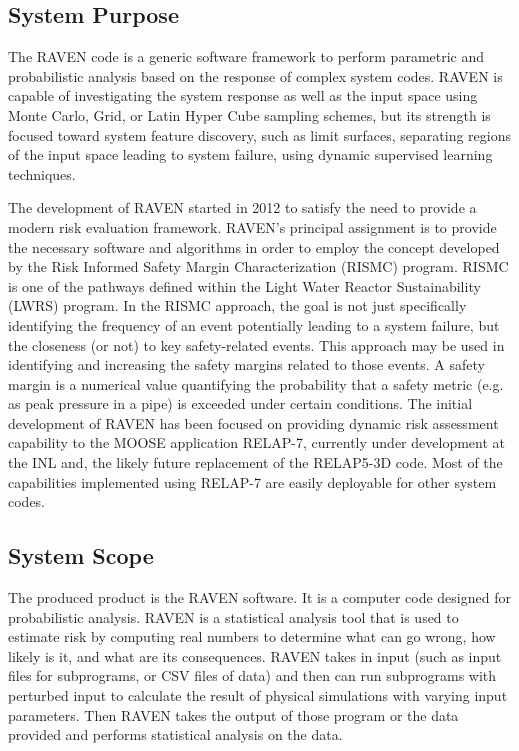 
\subsection{System Purpose}

The RAVEN code is a generic software framework to perform parametric
and probabilistic analysis based on the response of complex system
codes. RAVEN is capable of investigating the system response as well
as the input space using Monte Carlo, Grid, or Latin Hyper Cube
sampling schemes, but its strength is focused toward system feature
discovery, such as limit surfaces, separating regions of the input
space leading to system failure, using dynamic supervised learning
techniques.

The development of RAVEN started in 2012 to satisfy the need to
provide a modern risk evaluation framework. RAVEN's principal
assignment is to provide the necessary software and algorithms in
order to employ the concept developed by the Risk Informed Safety
Margin Characterization (RISMC) program. RISMC is one of the pathways
defined within the Light Water Reactor Sustainability (LWRS)
program. In the RISMC approach, the goal is not just specifically
identifying the frequency of an event potentially leading to a system
failure, but the closeness (or not) to key safety-related events. This
approach may be used in identifying and increasing the safety margins
related to those events. A safety margin is a numerical value
quantifying the probability that a safety metric (e.g. as peak
pressure in a pipe) is exceeded under certain conditions. The initial
development of RAVEN has been focused on providing dynamic risk
assessment capability to the MOOSE application RELAP-7, currently
under development at the INL and, the likely future replacement of the
RELAP5-3D code. Most of the capabilities implemented using RELAP-7 are
easily deployable for other system codes.

\subsection{System Scope}

The produced product is the RAVEN software.  It is a computer
code designed for probabilistic analysis.  RAVEN is a statistical
analysis tool that is used to estimate risk by computing real numbers
to determine what can go wrong, how likely is it, and what are its
consequences.  RAVEN takes in input (such as input files for
subprograms, or CSV files of data) and then can run subprograms with
perturbed input to calculate the result of physical simulations with
varying input parameters.  Then RAVEN takes the output of those
program or the data provided and performs statistical analysis on the
data.

